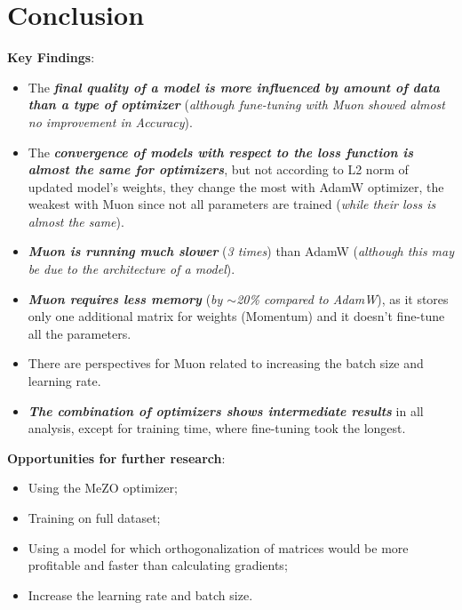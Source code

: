 \documentclass{report}
\begin{document}
\chapter{Conclusion}
\textbf{Key Findings}:
\begin{itemize}
    \item The \textit{\textbf{final quality of a model is more influenced by amount of data than a type of optimizer }}(\textit{although fune-tuning with Muon showed almost no improvement in Accuracy}).
    \item The \textit{\textbf{convergence of models with respect to the loss function is almost the same for optimizers}}, but not according to L2 norm of updated model's weights, they change the most with AdamW optimizer, the weakest with Muon since not all parameters are trained (\textit{while their loss is almost the same}).
    \item \textit{\textbf{Muon is running much slower}} (\textit{3 times}) than AdamW (\textit{although this may be due to the architecture of a model}).
    \item \textit{\textbf{Muon requires less memory}} (\textit{by $\sim$20\% compared to AdamW}), as it stores only one additional matrix for weights (Momentum) and it doesn't fine-tune all the parameters.
    \item There are perspectives for Muon related to increasing the batch size and learning rate.
    \item \textit{\textbf{The combination of optimizers shows intermediate results}} in all analysis, except for training time, where fine-tuning took the longest.
\end{itemize}

\noindent \textbf{Opportunities for further research}:
\begin{itemize}
    \item Using the MeZO optimizer;
    \item Training on full dataset;
    \item Using a model for which orthogonalization of matrices would be more profitable and faster than calculating gradients;
    \item Increase the learning rate and batch size.
\end{itemize}
\end{document}
